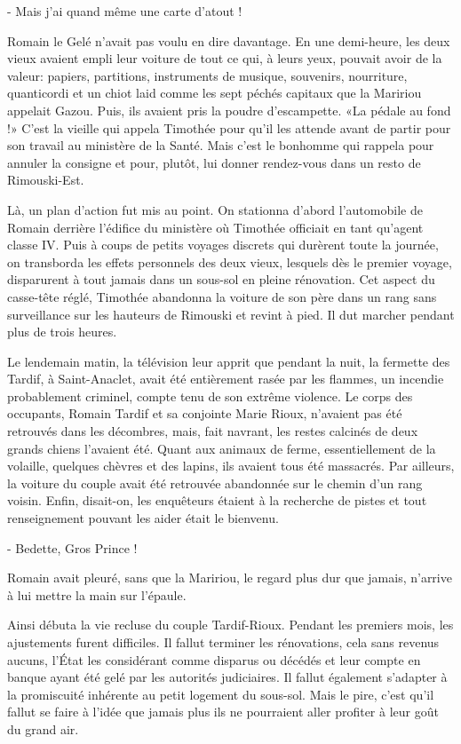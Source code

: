 - Mais j’ai quand même une carte d’atout !

Romain le Gelé n’avait pas voulu en dire davantage. En une demi-heure, les deux vieux avaient empli leur voiture de tout ce qui, à leurs yeux, pouvait avoir de la valeur: papiers, partitions, instruments de musique, souvenirs, nourriture, quanticordi et un chiot laid comme les sept péchés capitaux que la Maririou appelait Gazou. Puis, ils avaient pris la poudre d’escampette. «La pédale au fond !» C’est la vieille qui appela Timothée pour qu’il les attende avant de partir pour son travail au ministère de la Santé. Mais c’est le bonhomme qui rappela pour annuler la consigne et pour, plutôt, lui donner rendez-vous dans un resto de Rimouski-Est.

Là, un plan d’action fut mis au point. On stationna d’abord l’automobile de Romain derrière l’édifice du ministère où Timothée officiait en tant qu’agent classe IV. Puis à coups de petits voyages discrets qui durèrent toute la journée, on transborda les effets personnels des deux vieux, lesquels dès le premier voyage, disparurent à tout jamais dans un sous-sol en pleine rénovation. Cet aspect du casse-tête réglé, Timothée abandonna la voiture de son père dans un rang sans surveillance sur les hauteurs de Rimouski et revint à pied. Il dut marcher pendant plus de trois heures.

Le lendemain matin, la télévision leur apprit que pendant la nuit, la fermette des Tardif, à Saint-Anaclet, avait été entièrement rasée par les flammes, un incendie probablement criminel, compte tenu de son extrême violence. Le corps des occupants, Romain Tardif et sa conjointe Marie Rioux, n’avaient pas été retrouvés dans les décombres, mais, fait navrant, les restes calcinés de deux grands chiens l’avaient été. Quant aux animaux de ferme, essentiellement de la volaille, quelques chèvres et des lapins, ils avaient tous été massacrés. Par ailleurs, la voiture du couple avait été retrouvée abandonnée sur le chemin d’un rang voisin. Enfin, disait-on, les enquêteurs étaient à la recherche de pistes et tout renseignement pouvant les aider était le bienvenu.

- Bedette, Gros Prince !

Romain avait pleuré, sans que la Maririou, le regard plus dur que jamais, n’arrive à lui mettre la main sur l’épaule.

Ainsi débuta la vie recluse du couple Tardif-Rioux. Pendant les premiers mois, les ajustements furent difficiles. Il fallut terminer les rénovations, cela sans revenus aucuns, l’État les considérant comme disparus ou décédés et leur compte en banque ayant été gelé par les autorités judiciaires. Il fallut également s’adapter à la promiscuité inhérente au petit logement du sous-sol. Mais le pire, c’est qu’il fallut se faire à l’idée que jamais plus ils ne pourraient aller profiter à leur goût du grand air.

